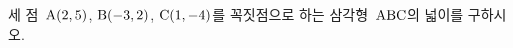 세 점~$\mathrm{A}(2{,}\mkern3mu\mathopen{}5)$, $\mathrm{B}(-3{,}\mkern3mu\mathopen{}2)$, $\mathrm{C}(1{,}\mkern3mu\mathopen{}-4)$를 꼭짓점으로 하는 삼각형~$\mathrm{ABC}$의 넓이를 구하시오.
